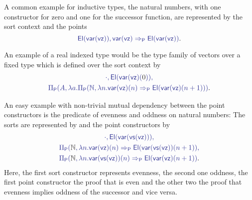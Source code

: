 \begin{example}\label{ex:if-natvec}
A common example for inductive types, the natural numbers, with one constructor for
zero and one for the successor function, are represented by the sort context
\tqm{\cdot_\Sc, \UU} and the points
\begin{equation*}
\tqm{\El(\var(\vz)), \var(\vz) \Rightarrow_\Pc \El(\var(\vz))} \text{.}
\end{equation*}

An example of a real indexed type would be the type family of vectors over a fixed
type  which is defined over the sort context
 by
\begin{equation*}
\begin{gathered}
\tqm{\cdot, \El(\var(\vz)(\blm{0})),}\\
\tqm{\Pi_\Pc(A, \lambda a. \Pi_\Pc(\N, \lambda n. \var(\vz)(n) \Rightarrow_\Pc \El(\var(\vz)(n + 1)))} \text{.}
\end{gathered}
\end{equation*}

An easy example with non-trivial mutual dependency between the point constructors
is the predicate of evenness and oddness on natural numbers: The sorts are
represented by 
and the point constructors by
\begin{equation*}
\begin{gathered}
\tqm{\cdot , \El(\var(\vs(\vz))),} \\
\tqm{\Pi_\Pc(\blm{\N}, \lambda n. \var(\vz)(n) \Rightarrow_\Pc \El(\var(\vs(\vz))(n + 1)),} \\
\tqm{\Pi_\Pc(\blm{\N}, \lambda n. \var(\vs(\vz))(n) \Rightarrow_\Pc \El(\var(\vz)(n + 1))} \text{.}
\end{gathered}
\end{equation*}
Here, the first sort constructor represents evenness, the second one oddness,
the first point constructor the proof that  is even and the other two the
proof that evenness implies oddness of the successor and vice versa.
\end{example}

